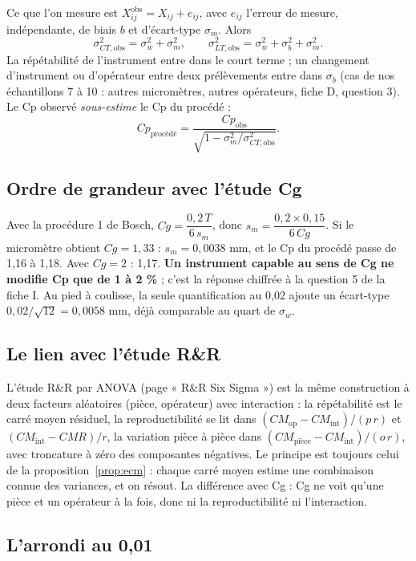 \documentclass[11pt,a4paper]{article}
\theoremstyle{tq}
\theoremstyle{remark}
\newcommand{\sw}{\sigma_w}
\newcommand{\sbt}{\sigma_b}
\begin{document}
Ce que l'on mesure est $X^{\text{obs}}_{ij} = X_{ij} + e_{ij}$, avec $e_{ij}$ l'erreur de mesure, indépendante, de biais $b$ et d'écart-type $\sigma_m$. Alors
\[
\sigma_{CT,\text{obs}}^2 = \sw^2+\sigma_m^2,\qquad
\sigma_{LT,\text{obs}}^2 = \sw^2+\sbt^2+\sigma_m^2 .
\]
La répétabilité de l'instrument entre dans le court terme ; un changement d'instrument ou d'opérateur entre deux prélèvements entre dans $\sbt$ (cas de nos échantillons 7 à 10 : autres micromètres, autres opérateurs, fiche D, question 3). Le Cp observé \emph{sous-estime} le Cp du procédé :
\[
Cp_{\text{procédé}} = \frac{Cp_{\text{obs}}}{\sqrt{1-\sigma_m^2/\sigma_{CT,\text{obs}}^2}} .
\]

\subsection{Ordre de grandeur avec l'étude Cg}

Avec la procédure 1 de Bosch, $Cg = \dfrac{0{,}2\,T}{6\,s_m}$, donc $s_m = \dfrac{0{,}2\times0{,}15}{6\,Cg}$. Si le micromètre obtient $Cg = 1{,}33$ : $s_m = 0{,}0038$ mm, et le Cp du procédé passe de 1,16 à 1,18. Avec $Cg=2$ : 1,17. \textbf{Un instrument capable au sens de Cg ne modifie Cp que de 1 à 2 \%} ; c'est la réponse chiffrée à la question 5 de la fiche I. Au pied à coulisse, la seule quantification au 0,02 ajoute un écart-type $0{,}02/\sqrt{12}=0{,}0058$ mm, déjà comparable au quart de $\sw$.

\subsection{Le lien avec l'étude R\&R}

L'étude R\&R par ANOVA (page « R\&R Six Sigma ») est la même construction à deux facteurs aléatoires (pièce, opérateur) avec interaction : la répétabilité est le carré moyen résiduel, la reproductibilité se lit dans $(CM_{\text{op}}-CM_{\text{int}})/(p\,r)$ et $(CM_{\text{int}}-CMR)/r$, la variation pièce à pièce dans $(CM_{\text{pièce}}-CM_{\text{int}})/(o\,r)$, avec troncature à zéro des composantes négatives. Le principe est toujours celui de la proposition~\ref{prop:ecm} : chaque carré moyen estime une combinaison connue des variances, et on résout. La différence avec Cg : Cg ne voit qu'une pièce et un opérateur à la fois, donc ni la reproductibilité ni l'interaction.

\subsection{L'arrondi au 0,01}
\end{document}
